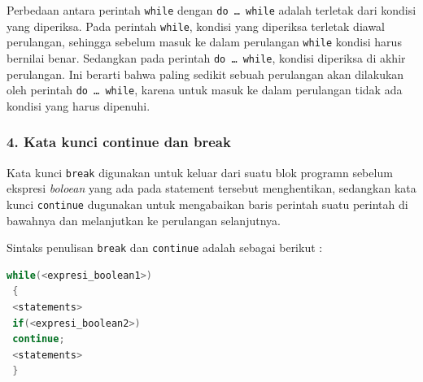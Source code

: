 Perbedaan antara perintah \texttt{while} dengan
\texttt{do\ \ldots{}\ while} adalah terletak dari kondisi yang
diperiksa. Pada perintah \texttt{while}, kondisi yang diperiksa terletak
diawal perulangan, sehingga sebelum masuk ke dalam perulangan
\texttt{while} kondisi harus bernilai benar. Sedangkan pada perintah
\texttt{do\ \ldots{}\ while}, kondisi diperiksa di akhir perulangan. Ini
berarti bahwa paling sedikit sebuah perulangan akan dilakukan oleh
perintah \texttt{do\ \ldots{}\ while}, karena untuk masuk ke dalam
perulangan tidak ada kondisi yang harus dipenuhi.

\subsubsection{4. Kata kunci continue dan
break}\label{kata-kunci-continue-dan-break}

Kata kunci \texttt{break} digunakan untuk keluar dari suatu blok
programn sebelum ekspresi \emph{boloean} yang ada pada statement
tersebut menghentikan, sedangkan kata kunci \texttt{continue} dugunakan
untuk mengabaikan baris perintah suatu perintah di bawahnya dan
melanjutkan ke perulangan selanjutnya.

Sintaks penulisan \texttt{break} dan \texttt{continue} adalah sebagai
berikut :

\begin{lstlisting}[language=c++, numbers=none]
 while(<expresi_boolean1>)
 {
 <statements>
 if(<expresi_boolean2>)
 continue;
 <statements>
 }
\end{lstlisting}
